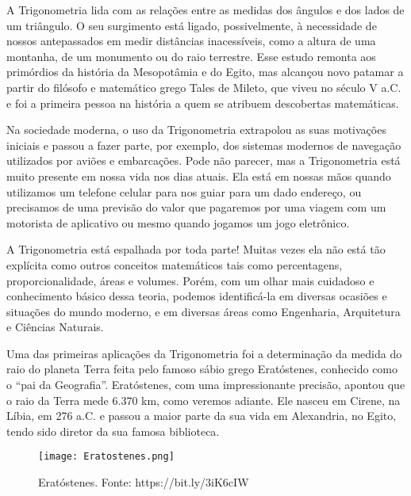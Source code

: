 
A Trigonometria lida com as relações entre as medidas dos ângulos e dos lados de um triângulo. O seu surgimento está ligado, possivelmente, à necessidade de nossos antepassados em medir distâncias inacessíveis, como a altura de uma montanha, de um monumento ou do raio terrestre. Esse estudo remonta aos primórdios da história da Mesopotâmia e do Egito, mas alcançou novo patamar a partir do filósofo e matemático grego Tales de Mileto, que viveu no século V a.C. e foi a primeira pessoa na história a quem se atribuem descobertas matemáticas.

Na sociedade moderna, o uso da Trigonometria extrapolou as suas motivações iniciais e passou a fazer parte, por exemplo, dos sistemas modernos de navegação utilizados por aviões e embarcações. Pode não parecer, mas a Trigonometria está muito presente em nossa vida nos dias atuais. Ela está em nossas mãos quando utilizamos um telefone celular para nos guiar para um dado endereço, ou precisamos de uma previsão do valor que pagaremos por uma viagem com um motorista de aplicativo ou mesmo quando jogamos um jogo eletrônico. 

A Trigonometria está espalhada por toda parte! Muitas vezes ela não está tão explícita como outros conceitos matemáticos tais como percentagens, proporcionalidade, áreas e volumes. Porém, com um olhar mais cuidadoso e conhecimento básico dessa teoria, podemos identificá-la em diversas ocasiões e situações do mundo moderno, e em diversas áreas como Engenharia, Arquitetura e Ciências Naturais.

Uma das primeiras aplicações da Trigonometria foi a determinação da medida do raio do planeta Terra feita pelo famoso sábio grego Eratóstenes, conhecido como o ``pai da Geografia''. Eratóstenes, com uma impressionante precisão, apontou que o raio da Terra mede $6.370$ km, como veremos adiante. Ele nasceu em Cirene, na Líbia, em 276 a.C. e passou a maior parte da sua vida em Alexandria, no Egito, tendo sido diretor da sua famosa biblioteca. 

\begin{figure}[H]
    \centering
    \texttt{[image: Eratostenes.png]}
    \caption{Eratóstenes. Fonte: https://bit.ly/3iK6cIW}
    \label{Eratostenes}
\end{figure}

